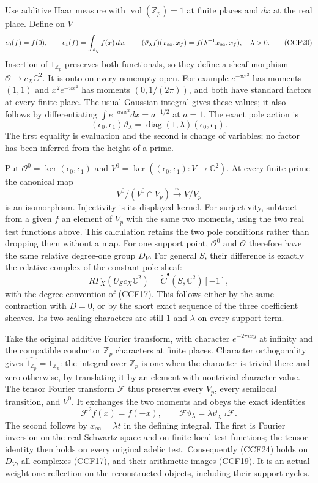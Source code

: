 Use additive Haar measure with $\operatorname{vol}(\mathbb Z_p)=1$
at finite places and $dx$ at the real place. Define on $V$
\[
 \epsilon_0(f)=f(0),\qquad \epsilon_1(f)=\int_{\mathbb A_\mathbb Q}f(x)\,dx,
 \qquad (\vartheta_\lambda f)(x_\infty,x_f)
       =f(\lambda^{-1}x_\infty,x_f),\quad\lambda>0.
 \tag{CCF20}
\]
Insertion of $1_{\mathbb Z_p}$ preserves both functionals, so
they define a sheaf morphism
$\mathcal O\to c_X\mathbb C^2$. It is onto on every nonempty
open. For example $e^{-\pi x^2}$ has moments $(1,1)$ and
$x^2e^{-\pi x^2}$ has moments $(0,1/(2\pi))$, and both have
standard factors at every finite place. The usual Gaussian
integral gives these values; it also follows by differentiating
$\int e^{-a\pi x^2}dx=a^{-1/2}$ at $a=1$.
The exact pole action is
\[
 (\epsilon_0,\epsilon_1)\vartheta_\lambda
       =\operatorname{diag}(1,\lambda)(\epsilon_0,\epsilon_1).
 \tag{CCF21}
\]
The first equality is evaluation and the second is change of
variables; no factor has been inferred from the height of a prime.

Put $\mathcal O^0=\ker(\epsilon_0,\epsilon_1)$ and
$V^0=\ker((\epsilon_0,\epsilon_1):V\to\mathbb C^2)$.
At every finite prime the canonical map
\[
 V^0/(V^0\cap V_p)\xrightarrow{\ \sim\ }V/V_p
 \tag{CCF22}
\]
is an isomorphism. Injectivity is its displayed kernel. For
surjectivity, subtract from a given $f$ an element of $V_p$
with the same two moments, using the two real test functions
above. This calculation retains the two pole conditions rather
than dropping them without a map. For one support point,
$\mathcal O^0$ and $\mathcal O$ therefore have the same relative
degree-one group $D_V$. For general $S$, their difference is
exactly the relative complex of the constant pole sheaf:
\[
 R\Gamma_X(U_Sc_X\mathbb C^2)
       =\widetilde C^\bullet(S,\mathbb C^2)[-1],
 \tag{CCF23}
\]
with the degree convention of (CCF17). This follows either
by the same contraction with $D=0$, or by the short exact
sequence of the three coefficient sheaves. Its two scaling
characters are still $1$ and $\lambda$ on every support term.

Take the original additive Fourier transform, with character
$e^{-2\pi ixy}$ at infinity and the compatible conductor
$\mathbb Z_p$ characters at finite places. Character
orthogonality gives $\widehat{1_{\mathbb Z_p}}=1_{\mathbb Z_p}$:
the integral over $\mathbb Z_p$ is one when the character is
trivial there and zero otherwise, by translating it by an
element with nontrivial character value. The tensor Fourier
transform $\mathcal F$ thus preserves every $V_p$, every
semilocal transition, and $V^0$. It exchanges the two moments
and obeys the exact identities
\[
 \mathcal F^2f(x)=f(-x),\qquad
 \mathcal F\vartheta_\lambda
     =\lambda\vartheta_{\lambda^{-1}}\mathcal F.
 \tag{CCF24}
\]
The second follows by $x_\infty=\lambda t$ in the defining
integral. The first is Fourier inversion on the real Schwartz
space and on finite local test functions; the tensor identity
then holds on every original adelic test. Consequently
(CCF24) holds on $D_V$, all complexes (CCF17), and their
arithmetic images (CCF19). It is an actual weight-one reflection
on the reconstructed objects, including their support cycles.

